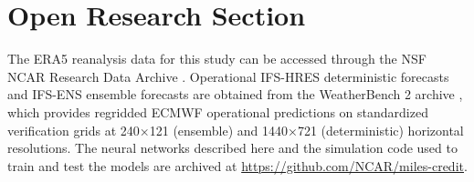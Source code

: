 \documentclass{agujournal2019}
\begin{document}




\section*{Open Research Section}
The ERA5 reanalysis data for this study can be accessed through the NSF NCAR Research Data Archive \cite{hersbach2020era5}. Operational IFS-HRES deterministic forecasts and IFS-ENS ensemble forecasts are obtained from the WeatherBench 2 archive \cite{rasp2023weatherbench2}, which provides regridded ECMWF operational predictions on standardized verification grids at 240×121 (ensemble) and 1440×721 (deterministic) horizontal resolutions. The neural networks described here and the simulation code used to train and test the models are archived at \url{https://github.com/NCAR/miles-credit}. 
\end{document}
